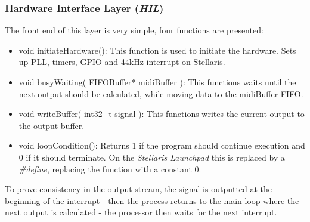 \subsubsection{Hardware Interface Layer (\emph{HIL})}
The front end of this layer is very simple, four functions are presented:
\begin{itemize}
  \item void initiateHardware(): This function is used to initiate the hardware.
  Sets up PLL, timers, GPIO and 44kHz interrupt on Stellaris.
  \item void busyWaiting( FIFOBuffer* midiBuffer ): This functions waits until
  the next output should be calculated, while moving data to the midiBuffer
  FIFO.
  \item void writeBuffer( int32\_t signal ): This functions writes the current
  output to the output buffer.
  \item void loopCondition(): Returns 1 if the program should continue execution
  and 0 if it should terminate. On the \emph{Stellaris Launchpad} this is
  replaced by a \emph{\#define}, replacing the function with a constant 0.
\end{itemize}

To prove consistency in the output stream, the signal is outputted at the
beginning of the interrupt - then the process returns to the main loop where the
next output is calculated - the processor then waits for the next interrupt.
